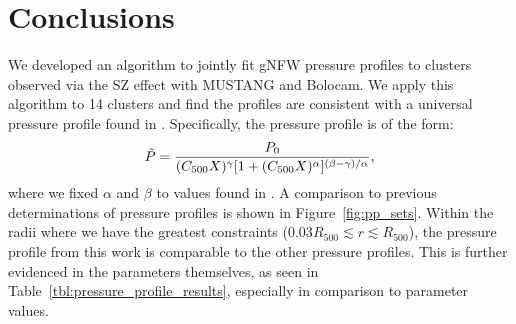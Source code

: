 \documentclass[iop,numberedappendix,apj]{emulateapj}
\begin{document}





\section{Conclusions}
\label{sec:conclusions}

We developed an algorithm to jointly fit gNFW pressure profiles to clusters observed via the SZ
effect with MUSTANG and Bolocam. We apply this algorithm to 14 clusters and find the profiles are 
consistent with a universal pressure profile found in \citet{arnaud2010}. Specifically, the 
pressure profile is of the form:
\begin{equation*}
  \Tilde{P} = \frac{P_0}{(C_{500} X)^{\gamma} [1 + (C_{500} X)^{\alpha}]^{(\beta - \gamma)/\alpha}},
\end{equation*}
where we fixed $\alpha$ and $\beta$ to values found in \citet{arnaud2010}. A comparison to previous
determinations of pressure profiles is shown in Figure~\ref{fig:pp_sets}. Within the radii where we
have the greatest constraints ($0.03 R_{500} \lesssim r \lesssim R_{500}$), the pressure profile from this
work is comparable to the other pressure profiles. This is further evidenced in the parameters themselves,
as seen in Table~\ref{tbl:pressure_profile_results}, especially in comparison to  parameter values.
\end{document}
